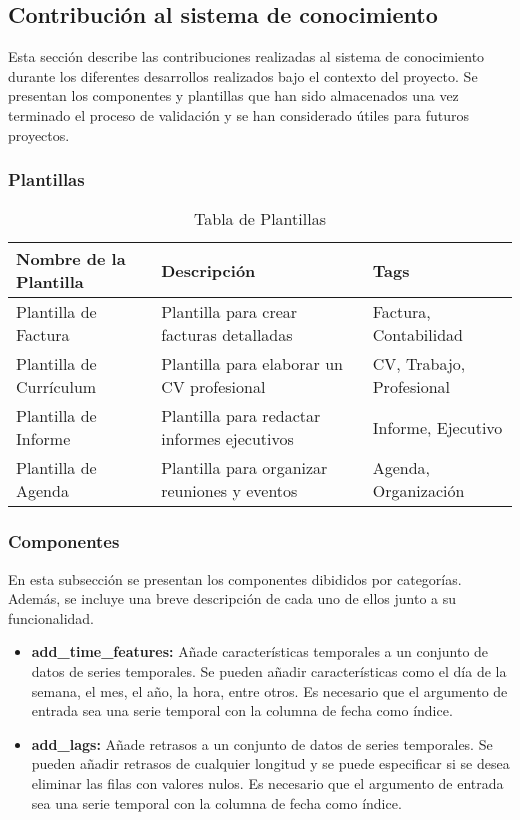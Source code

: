\subsection{Contribución al sistema de conocimiento}
Esta sección describe las contribuciones realizadas al sistema de conocimiento
durante los diferentes desarrollos realizados bajo el contexto del proyecto. 
Se presentan los componentes y plantillas que han sido almacenados una vez
terminado el proceso de validación y se han considerado útiles para futuros
proyectos.

\subsubsection{Plantillas}
\begin{table}[h!]
    \centering
    \begin{tabular}{| m{4cm} | m{7cm} | m{5cm} |}
      \hline
      \textbf{Nombre de la Plantilla} & \textbf{Descripción} & \textbf{Tags} \\ 
      \hline
      Plantilla de Factura & Plantilla para crear facturas detalladas & Factura, Contabilidad \\ 
      \hline
      Plantilla de Currículum & Plantilla para elaborar un CV profesional & CV, Trabajo, Profesional \\ 
      \hline
      Plantilla de Informe & Plantilla para redactar informes ejecutivos & Informe, Ejecutivo \\ 
      \hline
      Plantilla de Agenda & Plantilla para organizar reuniones y eventos & Agenda, Organización \\ 
      \hline
    \end{tabular}
    \caption{Tabla de Plantillas}
    \label{table:templates}    
\end{table}

\subsubsection{Componentes}
En esta subsección se presentan los componentes dibididos por categorías.
Además, se incluye una breve descripción de cada uno de ellos junto a su funcionalidad.

\begin{itemize}
    \item \textbf{add\_time\_features:} Añade características temporales a un conjunto de datos
    de series temporales. Se pueden añadir características como el día de la semana, el mes, el año,
    la hora, entre otros. Es necesario que el argumento de entrada sea una serie temporal con la
    columna de fecha como índice.
    \item \textbf{add\_lags:} Añade retrasos a un conjunto de datos de series temporales. Se pueden
    añadir retrasos de cualquier longitud y se puede especificar si se desea eliminar las filas con
    valores nulos. Es necesario que el argumento de entrada sea una serie temporal con la columna de
    fecha como índice.
\end{itemize}

